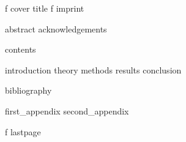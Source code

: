 \documentclass[12pt, a4paper, twoside, openright]{report}
\begin{document}
\if\thesisStatus f
	{cover}
\fi
{}
{title}
\if\thesisStatus f
	{imprint}
\fi

{abstract}
{acknowledgements}

{contents}


{introduction}
{theory}
{methods}
{results}
{conclusion}

{bibliography}

\cleardoublepage
\appendix
{}
{first_appendix}
{second_appendix}

\if\thesisStatus f
	{lastpage}
\fi
\end{document}
